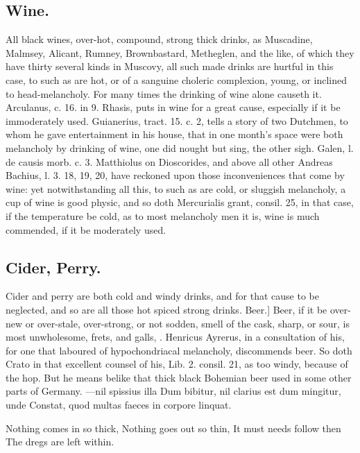 {\subsection{Wine.}
All black wines, over-hot, compound, strong thick drinks, as
Muscadine, Malmsey, Alicant, Rumney, Brownbastard, Metheglen, and the
like, of which they have thirty several kinds in Muscovy, all such made
drinks are hurtful in this case, to such as are hot, or of a sanguine
choleric complexion, young, or inclined to head-melancholy. For many
times the drinking of wine alone causeth it. Arculanus, c. 16. in 9.
Rhasis, puts in wine for a great cause, especially if it be
immoderately used. Guianerius, tract. 15. c. 2, tells a story of two
Dutchmen, to whom he gave entertainment in his house, that in one
month's space were both melancholy by drinking of wine, one did nought
but sing, the other sigh. Galen, l. de causis morb. c. 3. Matthiolus on
Dioscorides, and above all other Andreas Bachius, l. 3. 18, 19, 20,
have reckoned upon those inconveniences that come by wine: yet
notwithstanding all this, to such as are cold, or sluggish melancholy,
a cup of wine is good physic, and so doth Mercurialis grant, consil.
25, in that case, if the temperature be cold, as to most melancholy men
it is, wine is much commended, if it be moderately used.
\subsection{Cider, Perry.}
Cider and perry are both cold and windy drinks, and
for that cause to be neglected, and so are all those hot spiced strong
drinks.
Beer.] Beer, if it be over-new or over-stale, over-strong, or not
sodden, smell of the cask, sharp, or sour, is most unwholesome, frets,
and galls, \etc{}. Henricus Ayrerus, in a consultation of his, for
one that laboured of hypochondriacal melancholy, discommends beer. So
doth  Crato in that excellent counsel of his, Lib. 2. consil. 21,
as too windy, because of the hop. But he means belike that thick black
Bohemian beer used in some other parts of Germany.
---nil spissius illa
Dum bibitur, nil clarius est dum mingitur, unde
Constat, quod multas faeces in corpore linquat.

Nothing comes in so thick,
Nothing goes out so thin,
It must needs follow then
The dregs are left within.

}
